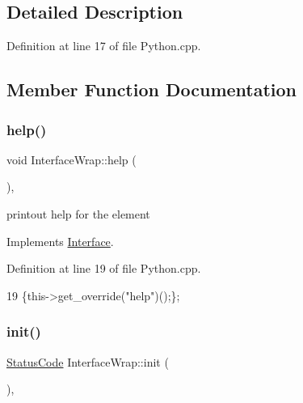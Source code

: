 \subsection{Detailed Description}


Definition at line 17 of file Python.\+cpp.



\subsection{Member Function Documentation}
\mbox{\label{structInterfaceWrap_abcf87065a7b9099a7d05e7c0ddaf2487}} 
\subsubsection{\texorpdfstring{help()}{help()}}
{\footnotesize\ttfamily void Interface\+Wrap\+::help (\begin{DoxyParamCaption}{ }\end{DoxyParamCaption})\hspace{0.3cm}{\ttfamily [inline]}, {\ttfamily [virtual]}}

printout help for the element 

Implements \hyperlink{classInterface_aedd3cf1d964c837e7848ccf81dc9c760}{Interface}.



Definition at line 19 of file Python.\+cpp.


\begin{DoxyCode}
19 \{this->get\_override(\textcolor{stringliteral}{"help"})();\};
\end{DoxyCode}
\mbox{\label{structInterfaceWrap_a2660ecdfbabd91d99d7b64c83e92f33c}} 
\subsubsection{\texorpdfstring{init()}{init()}}
{\footnotesize\ttfamily \hyperlink{classStatusCode}{Status\+Code} Interface\+Wrap\+::init (\begin{DoxyParamCaption}{ }\end{DoxyParamCaption})\hspace{0.3cm}{\ttfamily [inline]}, {\ttfamily [virtual]}}

